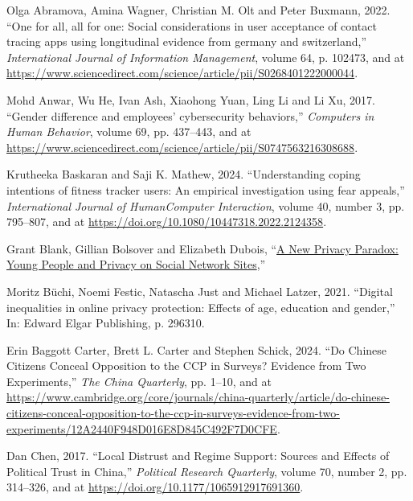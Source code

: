 \documentclass[
  letterpaper,
  DIV=11,
  numbers=noendperiod]{scrartcl}
\newlength{\cslhangindent}
\newenvironment{CSLReferences}[2] %
 {\begin{list}{}{%
  \setlength{\itemindent}{0pt}
  \setlength{\leftmargin}{0pt}
  \setlength{\parsep}{0pt}
  \ifodd #1
   \setlength{\leftmargin}{\cslhangindent}
   \setlength{\itemindent}{-1\cslhangindent}
  \fi
  \setlength{\itemsep}{#2\baselineskip}}}
 {\end{list}}
\begin{document}
\label{refs}
\begin{CSLReferences}{1}{1}
Olga Abramova, Amina Wagner, Christian M. Olt and Peter Buxmann, 2022.
{``One for all, all for one: Social considerations in user acceptance of
contact tracing apps using longitudinal evidence from germany and
switzerland,''} \emph{International Journal of Information Management},
volume 64, p. 102473, and at
\url{https://www.sciencedirect.com/science/article/pii/S0268401222000044}.

Mohd Anwar, Wu He, Ivan Ash, Xiaohong Yuan, Ling Li and Li Xu, 2017.
{``Gender difference and employees' cybersecurity behaviors,''}
\emph{Computers in Human Behavior}, volume 69, pp. 437--443, and at
\url{https://www.sciencedirect.com/science/article/pii/S0747563216308688}.

Krutheeka Baskaran and Saji K. Mathew, 2024. {``Understanding coping
intentions of fitness tracker users: An empirical investigation using
fear appeals,''} \emph{International Journal of
Human{\textendash}Computer Interaction}, volume 40, number 3, pp.
795--807, and at \url{https://doi.org/10.1080/10447318.2022.2124358}.

Grant Blank, Gillian Bolsover and Elizabeth Dubois,
{``\href{https://doi.org/10.2139/ssrn.2479938}{A New Privacy Paradox:
Young People and Privacy on Social Network Sites},''}

Moritz Büchi, Noemi Festic, Natascha Just and Michael Latzer, 2021.
{``Digital inequalities in online privacy protection: Effects of age,
education and gender,''} In: Edward Elgar Publishing, p. 296310.

Erin Baggott Carter, Brett L. Carter and Stephen Schick, 2024. {``Do
Chinese Citizens Conceal Opposition to the CCP in Surveys? Evidence from
Two Experiments,''} \emph{The China Quarterly}, pp. 1--10, and at
\url{https://www.cambridge.org/core/journals/china-quarterly/article/do-chinese-citizens-conceal-opposition-to-the-ccp-in-surveys-evidence-from-two-experiments/12A2440F948D016E8D845C492F7D0CFE}.

Dan Chen, 2017. {``Local Distrust and Regime Support: Sources and
Effects of Political Trust in China,''} \emph{Political Research
Quarterly}, volume 70, number 2, pp. 314--326, and at
\url{https://doi.org/10.1177/1065912917691360}.


\end{CSLReferences}
\end{document}
